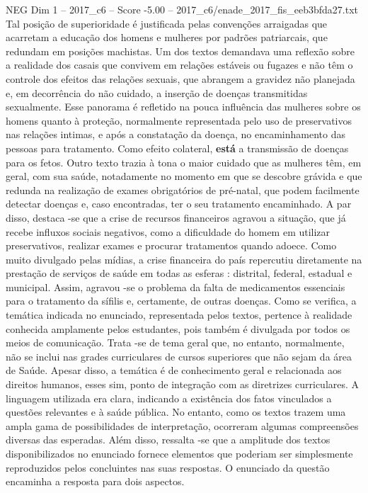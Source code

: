 \begin{textsample}{NEG Dim 1 – 2017\_c6 – Score -5.00 – 2017\_c6/enade\_2017\_fis\_eeb3bfda27.txt}
Tal posição de superioridade é justificada pelas convenções arraigadas que acarretam a educação dos homens e mulheres por padrões patriarcais, que redundam em posições machistas.
Um dos textos demandava uma reflexão sobre a realidade dos casais que convivem em relações estáveis ou fugazes e não têm o controle dos efeitos das relações sexuais, que abrangem a gravidez não planejada e, em decorrência do não cuidado, a inserção de doenças transmitidas sexualmente.
Esse panorama é refletido na pouca influência das mulheres sobre os homens quanto à proteção, normalmente representada pelo uso de preservativos nas relações intimas, e após a constatação da doença, no encaminhamento das pessoas para tratamento.
Como efeito colateral, \textbf{está} a transmissão de doenças para os fetos.
Outro texto trazia à tona o maior cuidado que as mulheres têm, em geral, com sua saúde, notadamente no momento em que se descobre grávida e que redunda na realização de exames obrigatórios de pré-natal, que podem facilmente detectar doenças e, caso encontradas, ter o seu tratamento encaminhado.
A par disso, destaca -se que a crise de recursos financeiros agravou a situação, que já recebe influxos sociais negativos, como a dificuldade do homem em utilizar preservativos, realizar exames e procurar tratamentos quando adoece.
Como muito divulgado pelas mídias, a crise financeira do país repercutiu diretamente na prestação de serviços de saúde em todas as esferas : distrital, federal, estadual e municipal.
Assim, agravou -se o problema da falta de medicamentos essenciais para o tratamento da sífilis e, certamente, de outras doenças.
Como se verifica, a temática indicada no enunciado, representada pelos textos, pertence à realidade conhecida amplamente pelos estudantes, pois também é divulgada por todos os meios de comunicação.
Trata -se de tema geral que, no entanto, normalmente, não se inclui nas grades curriculares de cursos superiores que não sejam da área de Saúde.
Apesar disso, a temática é de conhecimento geral e relacionada aos direitos humanos, esses sim, ponto de integração com as diretrizes curriculares.
A linguagem utilizada era clara, indicando a existência dos fatos vinculados a questões relevantes e à saúde pública.
No entanto, como os textos trazem uma ampla gama de possibilidades de interpretação, ocorreram algumas compreensões diversas das esperadas.
Além disso, ressalta -se que a amplitude dos textos disponibilizados no enunciado fornece elementos que poderiam ser simplesmente reproduzidos pelos concluintes nas suas respostas.
O enunciado da questão encaminha a resposta para dois aspectos.

\end{textsample}

